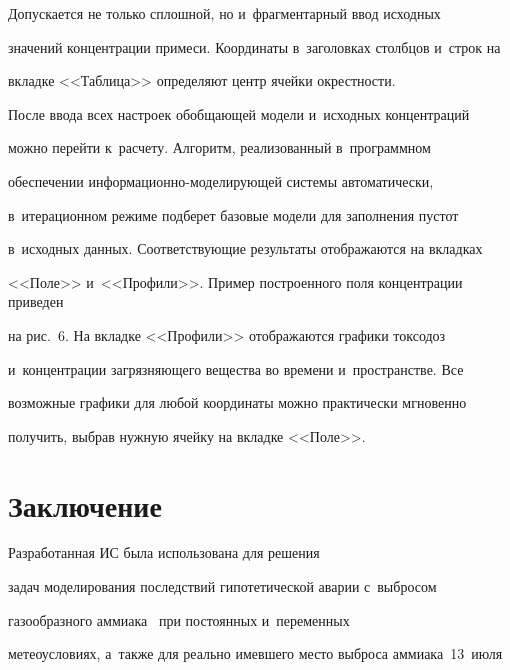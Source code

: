   Допускается не только сплошной, но и~фрагментарный ввод исходных 


значений концентрации примеси. Координаты в~заголовках столб\-цов и~строк на 


вкладке <<Таблица>> определяют центр ячейки окрестности.








  


  После ввода всех настроек обобщающей модели и~исходных концентраций 


можно перейти к~расчету. Алгоритм, реализованный в~программном 


обеспечении ин\-фор\-ма\-ци\-он\-но-мо\-де\-ли\-ру\-ющей сис\-те\-мы автоматически, 


в~итерационном режиме подберет базовые модели для заполнения пустот 


в~исходных данных. Соответствующие результаты отображаются на вкладках 


<<Поле>> и~<<Профили>>. Пример построенного поля концентрации приведен 


на рис.~6. На вкладке <<Профили>> отображаются графики токсодоз 


и~концентрации загрязняющего вещества во времени и~пространстве. Все 


возможные графики для любой координаты можно практически мгновенно 


получить, выбрав нужную ячейку на вкладке <<Поле>>.


   





\vspace*{-6pt}





  \section{Заключение}


  


  Разработанная ИС была использована для решения 


задач моделирования последствий гипотетической аварии с~выбросом 


газообразного аммиака~\cite{4-dud} при постоянных и~переменных 


метеоусловиях, а~так\-же для реально имевшего место выброса аммиака~13~июля 


